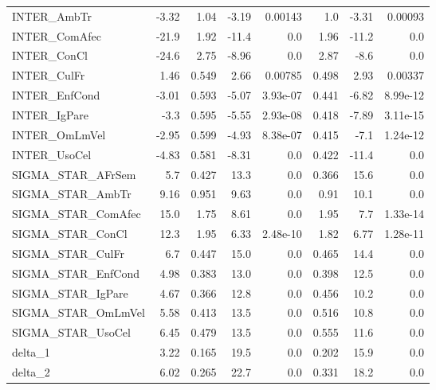 \begin{tabular}{lrrrrrrr}
INTER\_AmbTr        &  -3.32 &     1.04 &   -3.19 &  0.00143 &           1.0 &        -3.31 &       0.00093 \\
INTER\_ComAfec      &  -21.9 &     1.92 &   -11.4 &      0.0 &          1.96 &        -11.2 &           0.0 \\
INTER\_ConCl        &  -24.6 &     2.75 &   -8.96 &      0.0 &          2.87 &         -8.6 &           0.0 \\
INTER\_CulFr        &   1.46 &    0.549 &    2.66 &  0.00785 &         0.498 &         2.93 &       0.00337 \\
INTER\_EnfCond      &  -3.01 &    0.593 &   -5.07 & 3.93e-07 &         0.441 &        -6.82 &      8.99e-12 \\
INTER\_IgPare       &   -3.3 &    0.595 &   -5.55 & 2.93e-08 &         0.418 &        -7.89 &      3.11e-15 \\
INTER\_OmLmVel      &  -2.95 &    0.599 &   -4.93 & 8.38e-07 &         0.415 &         -7.1 &      1.24e-12 \\
INTER\_UsoCel       &  -4.83 &    0.581 &   -8.31 &      0.0 &         0.422 &        -11.4 &           0.0 \\
SIGMA\_STAR\_AFrSem  &    5.7 &    0.427 &    13.3 &      0.0 &         0.366 &         15.6 &           0.0 \\
SIGMA\_STAR\_AmbTr   &   9.16 &    0.951 &    9.63 &      0.0 &          0.91 &         10.1 &           0.0 \\
SIGMA\_STAR\_ComAfec &   15.0 &     1.75 &    8.61 &      0.0 &          1.95 &          7.7 &      1.33e-14 \\
SIGMA\_STAR\_ConCl   &   12.3 &     1.95 &    6.33 & 2.48e-10 &          1.82 &         6.77 &      1.28e-11 \\
SIGMA\_STAR\_CulFr   &    6.7 &    0.447 &    15.0 &      0.0 &         0.465 &         14.4 &           0.0 \\
SIGMA\_STAR\_EnfCond &   4.98 &    0.383 &    13.0 &      0.0 &         0.398 &         12.5 &           0.0 \\
SIGMA\_STAR\_IgPare  &   4.67 &    0.366 &    12.8 &      0.0 &         0.456 &         10.2 &           0.0 \\
SIGMA\_STAR\_OmLmVel &   5.58 &    0.413 &    13.5 &      0.0 &         0.516 &         10.8 &           0.0 \\
SIGMA\_STAR\_UsoCel  &   6.45 &    0.479 &    13.5 &      0.0 &         0.555 &         11.6 &           0.0 \\
delta\_1            &   3.22 &    0.165 &    19.5 &      0.0 &         0.202 &         15.9 &           0.0 \\
delta\_2            &   6.02 &    0.265 &    22.7 &      0.0 &         0.331 &         18.2 &           0.0 \\
\bottomrule
\end{tabular}

